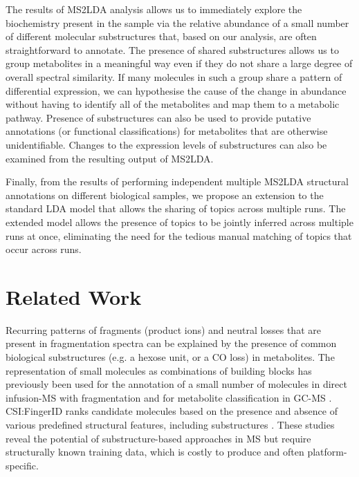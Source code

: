 The results of MS2LDA analysis allows us to immediately explore the biochemistry present in the sample via the relative abundance of a small number of different molecular substructures that, based on our analysis, are often straightforward to annotate. The presence of shared substructures allows us to group metabolites in a meaningful way even if they do not share a large degree of overall spectral similarity. If many molecules in such a group share a pattern of differential expression, we can hypothesise the cause of the change in abundance without having to identify all of the metabolites and map them to a metabolic pathway. Presence of substructures can also be used to provide putative annotations (or functional classifications) for metabolites that are otherwise unidentifiable. Changes to the expression levels of substructures can also be examined from the resulting output of MS2LDA. 

Finally, from the results of performing independent multiple MS2LDA structural annotations on different biological samples, we propose an extension to the standard LDA model that allows the sharing of topics across multiple runs. The extended model allows the presence of topics to be jointly inferred across multiple runs at once, eliminating the need for the tedious manual matching of topics that occur across runs.

\section{Related Work}

Recurring patterns of fragments (product ions) and neutral losses that are present in fragmentation spectra can be explained by the presence of common biological substructures (e.g. a hexose unit, or a CO loss) in metabolites. The representation of small molecules as combinations of building blocks has previously been used for the annotation of a small number of molecules in direct infusion-MS with fragmentation \cite{Sweeney2014} and for metabolite classification in GC-MS \cite{Scott1994, Hummel2010}. CSI:FingerID ranks candidate molecules based on the presence and absence of various predefined structural features, including substructures \cite{Duhrkop2015}. These studies reveal the potential of substructure-based approaches in MS but require structurally known training data, which is costly to produce and often platform-specific. 

